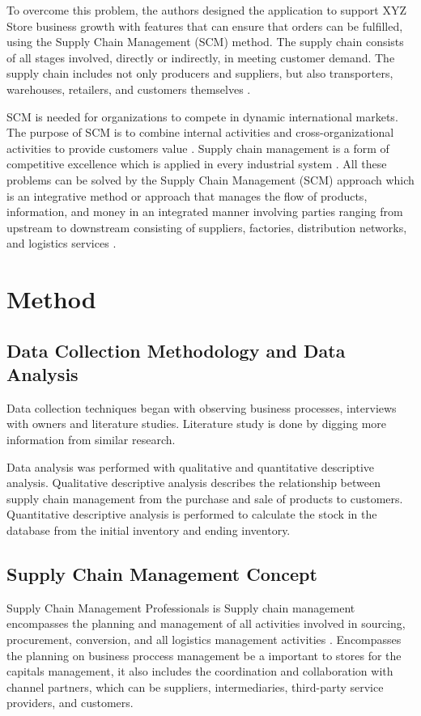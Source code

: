 \documentclass[12pt,a4paper,final]{iopart}
\begin{document}
To overcome this problem, the authors designed the application to support XYZ Store business growth with features that can ensure that orders can be fulfilled, using the Supply Chain Management (SCM) method. The supply chain consists of all stages involved, directly or indirectly, in meeting customer demand. The supply chain includes not only producers and suppliers, but also transporters, warehouses, retailers, and customers themselves \cite{Sharma2012}.

SCM is needed for organizations to compete in dynamic international markets. The purpose of SCM is to combine internal activities and cross-organizational activities to provide customers value \cite{Habib2019}. Supply chain management is a form of competitive excellence which is applied in every industrial system \cite{Sampouw}. All these problems can be solved by the Supply Chain Management (SCM) approach which is an integrative method or approach that manages the flow of products, information, and money in an integrated manner involving parties ranging from upstream to downstream consisting of suppliers, factories, distribution networks, and logistics services \cite{Widianty2019}.

\section{Method}
\subsection{Data Collection Methodology and Data Analysis}
Data collection techniques began with observing business processes, interviews with owners and literature studies. Literature study is done by digging more information from similar research.

Data analysis was performed with qualitative and quantitative descriptive analysis. Qualitative descriptive analysis describes the relationship between supply chain management from the purchase and sale of products to customers. Quantitative descriptive analysis is performed to calculate the stock in the database from the initial inventory and ending inventory.

\subsection{Supply Chain Management Concept}

Supply Chain Management Professionals is Supply chain management encompasses the planning and management of all activities involved in sourcing, procurement, conversion, and all logistics management activities \cite{Liu2011a}. Encompasses the planning on business proccess management be a important to stores for the capitals management, it also includes the coordination and collaboration with channel partners, which can be suppliers, intermediaries, third-party service providers, and customers.
\end{document}

